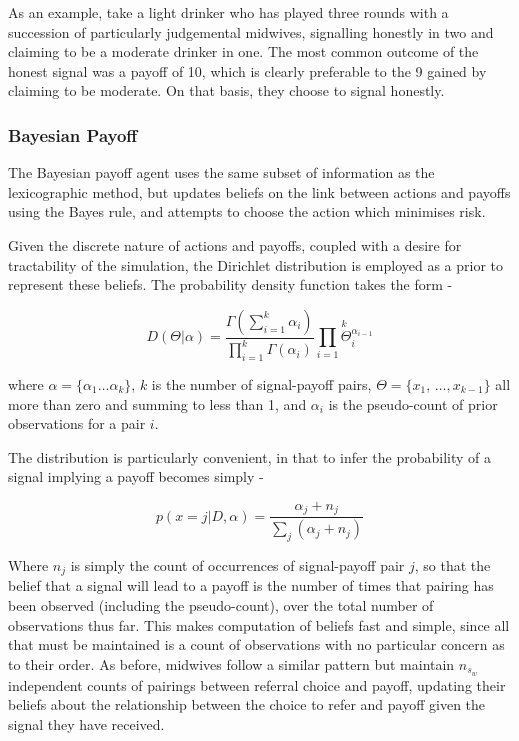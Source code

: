 As an example, take a light drinker who has played three rounds with a succession of particularly judgemental midwives, signalling honestly in two and claiming to be a moderate drinker in one. The most common outcome of the honest signal was a payoff of 10, which is clearly preferable to the 9 gained by claiming to be moderate. On that basis, they choose to signal honestly.

\subsubsection{Bayesian Payoff}

The Bayesian payoff agent uses the same subset of information as the lexicographic method, but updates beliefs on the link between actions and payoffs using the Bayes rule, and attempts to choose the action which minimises risk.

Given the discrete nature of actions and payoffs, coupled with a desire for tractability of the
simulation, the Dirichlet distribution is employed as a prior to represent these beliefs. The probability
density function takes the form -

\begin{equation}
D(\Theta|\alpha)=\frac{\Gamma(\sum_{i=1}^{k}\alpha_{i})}{\prod_{i=1}^{k}\Gamma(\alpha_{i})}\overset{k}{\underset{i=1}{\prod}\Theta_{i}^{\alpha_{i-1}}}
\end{equation}


where \(\alpha=\{\alpha_{1}\ldots\alpha_{k}\}\), \(k\) is the number
of signal-payoff pairs, \(\Theta=\{x_{1},\,\ldots,x_{k-\text{1}}\}\) all
more than zero and summing to less than 1, and \(\alpha_{i}\) is the 
pseudo-count of prior observations for a pair \(i\). 

The distribution is particularly convenient, in that to infer the
probability of a signal implying a payoff becomes
simply -

\begin{equation}
p(x=j|D,\alpha)=\frac{\alpha_{j}+n_{j}}{\sum_{j}(\alpha_{j}+n_{j})}\label{eq:posterior}
\end{equation}


Where \(n_{j}\) is simply the count of occurrences of signal-payoff pair \(j\), so
that the belief that a signal will lead to a payoff is the number
of times that pairing has been observed (including the pseudo-count),
over the total number of observations thus far. This makes computation
of beliefs fast and simple, since all that must be maintained is
a count of observations with no particular concern as to their order.
As before, midwives follow a similar pattern but maintain \(n_{s_{w}}\) independent counts of pairings between referral choice and payoff, updating their beliefs about the relationship between the choice to refer and payoff given the signal they have received.

